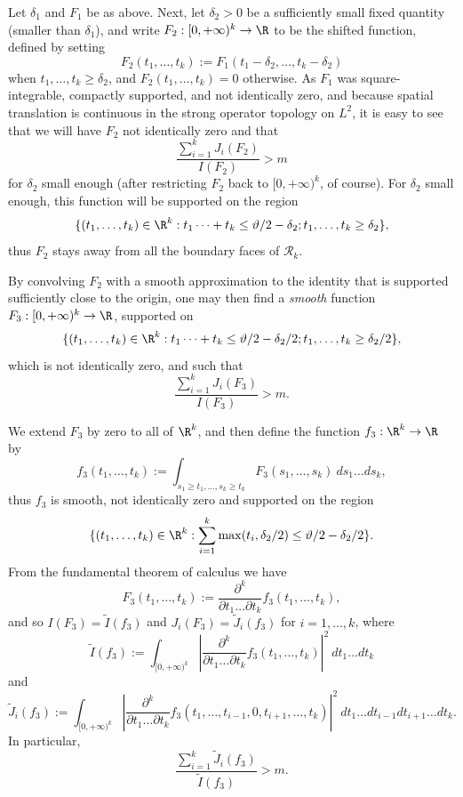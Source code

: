 Let $\delta_1$ and $F_1$ be as above. Next, let $\delta_2 > 0$ be a sufficiently small fixed quantity (smaller than $\delta_1$), and write $F_2: [0,+\infty)^k \to \R$ to be the shifted function, defined by setting
$$ F_2(t_1,\dots,t_k) := F_1( t_1-\delta_2, \dots, t_k-\delta_2 )$$
when $t_1,\dots,t_k \geq \delta_2$, and $F_2(t_1,\dots,t_k)=0$ otherwise.
As $F_1$ was square-integrable, compactly supported, and not identically zero, and because spatial translation is continuous in the strong operator topology on $L^2$, it is easy to see that we will have $F_2$ not identically zero and that
\begin{equation}\label{jbig-3}
 \frac{\sum_{i=1}^k J_i(F_2)}{I(F_2)} > m
\end{equation}
for $\delta_2$ small enough (after restricting $F_2$ back to $[0,+\infty)^k$, of course).  For $\delta_2$ small enough, this function will be supported on the region
$$
\{ (t_1,\dots,t_k) \in \R^k: t_1 \dots + t_k \leq \vartheta/2-\delta_2; t_1,\dots,t_k \geq \delta_2 \},$$
thus $F_2$ stays away from all the boundary faces of ${\mathcal R}_k$.

By convolving $F_2$ with a smooth approximation to the identity that is supported sufficiently close to the origin, one may then find a \emph{smooth} function $F_3: [0,+\infty)^k \to \R$, supported on
$$
\{ (t_1,\dots,t_k) \in \R^k: t_1 \dots + t_k \leq \vartheta/2-\delta_2/2; t_1,\dots,t_k \geq \delta_2/2 \},$$
which is not identically zero, and such that
\begin{equation}\label{jbig-4}
 \frac{\sum_{i=1}^k J_i(F_3)}{I(F_3)} > m.
\end{equation}

We extend $F_3$ by zero to all of $\R^k$, and then define the function $f_3: \R^k \to \R$ by
$$ f_3(t_1,\dots,t_k) := \int_{s_1 \geq t_1, \dots, s_k \geq t_k} F_3(s_1,\dots,s_k)\ ds_1 \dots ds_k,$$
thus $f_3$ is smooth, not identically zero and supported on the region
$$ \{ (t_1,\dots,t_k) \in \R^k: \sum_{i=1}^k \max(t_i, \delta_2/2) \leq \vartheta/2 - \delta_2/2 \}.$$
From the fundamental theorem of calculus we have
\begin{equation}\label{ftj}
 F_3(t_1,\dots,t_k) := \frac{\partial^k}{\partial t_1 \dots \partial t_k} f_3(t_1,\dots,t_k),
\end{equation}
and so $I(F_3) = \tilde I(f_3)$ and $J_i(F_3) = \tilde J_i(f_3)$ for $i=1,\dots,k$, where
\begin{equation}\label{tidef}
 \tilde I(f_3) := \int_{[0,+\infty)^k} |\frac{\partial^k}{\partial t_1 \dots \partial t_k} f_3(t_1,\dots,t_k)|^2\ dt_1 \dots dt_k
\end{equation}
and
\begin{equation}\label{tjdef}
 \tilde J_i(f_3) := \int_{[0,+\infty)^k} |\frac{\partial^k}{\partial t_1 \dots \partial t_k} f_3(t_1,\dots,t_{i-1}, 0, t_{i+1}, \dots, t_k)|^2\ dt_1 \dots dt_{i-1} dt_{i+1} \dots dt_k.
\end{equation}
In particular, 
\begin{equation}\label{jbig-5}
 \frac{\sum_{i=1}^k \tilde J_i(f_3)}{\tilde I(f_3)} > m.
\end{equation}

